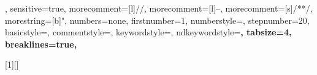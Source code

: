 {%
    ,
  sensitive=true,  %
  morecomment=[l]//,%
  morecomment=[l]{--},%
  morecomment=[s]{/*}{*/},%
  morestring=[b]",
  numbers=none,
  firstnumber=1,
  numberstyle=\tiny,
  stepnumber=20,
  basicstyle=\scriptsize\ttfamily,
  commentstyle=\color{mygreen},
  keywordstyle=\color{blue},
  ndkeywordstyle=\bfseries,
  tabsize=4,
  breaklines=true,
}

\def\A{%
    \lstinline[language=alloy,basicstyle=\ttfamily,columns=fixed]}

% paragraph
[1][]{%
  }{}

\newcommand{\alloyfile}[1]{
  
}
